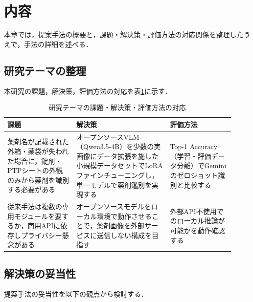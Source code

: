 \documentclass{jsarticle}
\begin{document}
\newpage

\section{内容}\label{sec3}

本章では，提案手法の概要と，課題・解決策・評価方法の対応関係を整理したうえで，手法の詳細を述べる．

\subsection{研究テーマの整理}

本研究の課題，解決策，評価方法の対応を表\ref{tab:theme}に示す．

\begin{table}[h]
\centering
\caption{研究テーマの課題・解決策・評価方法の対応}
\label{tab:theme}
\small
\setlength{\tabcolsep}{4pt}
\begin{tabular}{p{0.28\linewidth}p{0.38\linewidth}p{0.26\linewidth}}
\hline
課題 & 解決策 & 評価方法 \\
\hline
薬剤名が記載された外箱・薬袋が失われた場合に，錠剤・PTPシートの外観のみから薬剤を識別する必要がある &
オープンソースVLM（Qwen3.5-4B）を少数の実画像にデータ拡張を施した小規模データセットでLoRAファインチューニングし，単一モデルで薬剤鑑別を実現する &
Top-1 Accuracy（学習・評価データ分離）でGeminiのゼロショット識別と比較する \\
\hline
従来手法は複数の専用モジュールを要するか，商用APIに依存しプライバシー懸念がある &
オープンソースモデルをローカル環境で動作させることで，薬剤画像を外部サービスに送信しない構成を目指す &
外部API不使用でのローカル推論が可能かを動作確認する \\
\hline
\end{tabular}
\end{table}

\subsection{解決策の妥当性}

提案手法の妥当性を以下の観点から検討する．
\end{document}
